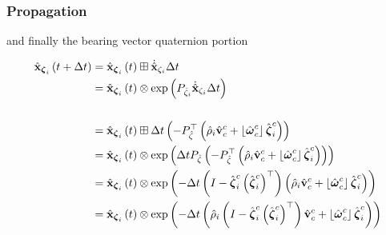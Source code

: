 \documentclass{beamer}
\begin{document}
\begin{frame}
\frametitle{Propagation}
and finally the bearing vector quaternion portion

\begin{align*}
\hat{{\bf x}}_{\boldsymbol{\zeta}_{i}}\left(t+\Delta t\right) & =\hat{{\bf x}}_{\boldsymbol{\zeta}_{i}}\left(t\right)\boxplus\dot{\hat{{\bf x}}}_{\zeta_{i}}\Delta t\\
 & =\hat{{\bf x}}_{\boldsymbol{\zeta}_{i}}\left(t\right)\otimes\exp\left(P_{\hat{\zeta}_{i}}\dot{\hat{{\bf x}}}_{\zeta_{i}}\Delta t\right)\\
\\
 & =\hat{{\bf x}}_{\boldsymbol{\zeta}_{i}}\left(t\right)\boxplus\Delta t\left(-P_{\hat{\zeta}}^{\top}\left(\hat{\rho}_{i}\hat{{\bf v}}_{c}^{c}+\left\lfloor \hat{\boldsymbol{\omega}}_{c}^{c}\right\rfloor \hat{\boldsymbol{\zeta}}_{i}^{c}\right)\right)\\
 & =\hat{{\bf x}}_{\boldsymbol{\zeta}_{i}}\left(t\right)\otimes\exp\left(\Delta tP_{\hat{\zeta}}\left(-P_{\hat{\zeta}}^{\top}\left(\hat{\rho}_{i}\hat{{\bf v}}_{c}^{c}+\left\lfloor \hat{\boldsymbol{\omega}}_{c}^{c}\right\rfloor \hat{\boldsymbol{\zeta}}_{i}^{c}\right)\right)\right)\\
 & =\hat{{\bf x}}_{\boldsymbol{\zeta}_{i}}\left(t\right)\otimes\exp\left(-\Delta t\left(I-\hat{\boldsymbol{\zeta}}_{i}^{c}\left(\hat{\boldsymbol{\zeta}}_{i}^{c}\right)^{\top}\right)\left(\hat{\rho}_{i}\hat{{\bf v}}_{c}^{c}+\left\lfloor \hat{\boldsymbol{\omega}}_{c}^{c}\right\rfloor \hat{\boldsymbol{\zeta}}_{i}^{c}\right)\right)\\
 & =\hat{{\bf x}}_{\boldsymbol{\zeta}_{i}}\left(t\right)\otimes\exp\left(-\Delta t\left(\hat{\rho}_{i}\left(I-\hat{\boldsymbol{\zeta}}_{i}^{c}\left(\hat{\boldsymbol{\zeta}}_{i}^{c}\right)^{\top}\right)\hat{{\bf v}}_{c}^{c}+\left\lfloor \hat{\boldsymbol{\omega}}_{c}^{c}\right\rfloor \hat{\boldsymbol{\zeta}}_{i}^{c}\right)\right)
\end{align*}
\end{frame}
\end{document}
